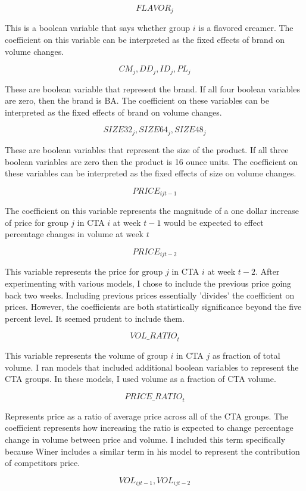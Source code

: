 \documentclass{article}
\begin{document}
$${FLAVOR}_{j}$$ 

This is a boolean variable that says whether group $i$ is a flavored creamer. The coefficient on this variable can be interpreted as the fixed effects of brand on volume changes.

$${CM}_{j}, {DD}_{j},{ID}_{j}, {PL}_{j} $$ 

These are boolean variable that represent the brand. If all four boolean variables are zero, then the brand is BA. The coefficient on these variables can be interpreted as the fixed effects of brand on volume changes.

$${SIZE32}_{j}, {SIZE64}_{j}, {SIZE48}_{j}$$ 

These are boolean variables that represent the size of the product. If all three boolean variables are zero then the product is 16 ounce units.  The coefficient on these variables can be interpreted as the fixed effects of size on volume changes.

$${PRICE}_{ijt-1} $$

The coefficient on this variable represents the magnitude of a one dollar increase of price for group $j$ in CTA $i$ at week $t-1$ would be expected to effect percentage changes in volume at week $t$

$${PRICE}_{ijt-2} $$ 

This variable represents the price for group $j$ in CTA $i$ at week $t-2$. After experimenting with various models, I chose to include the previous price going back two weeks. Including previous prices essentially 'divides' the coefficient on prices. However, the coefficients are both statistically significance beyond the five percent level. It seemed prudent to include them.

$${VOL\_RATIO}_t $$ 

This variable represents the volume of group $i$ in CTA $j$ as  fraction of total volume. I ran models that included additional boolean variables to represent the CTA groups. In these models, I used volume as a fraction of CTA volume.

$${PRICE\_RATIO}_{t} $$ 

Represents price as a ratio of average price across all of the CTA groups. The coefficient represents how increasing the ratio is expected to change percentage change in volume between price and volume.  I included this term specifically because Winer includes a similar term in his model to represent the contribution of competitors price.

$${VOL}_{ijt-1}, {VOL}_{ijt-2} $$
\end{document}
